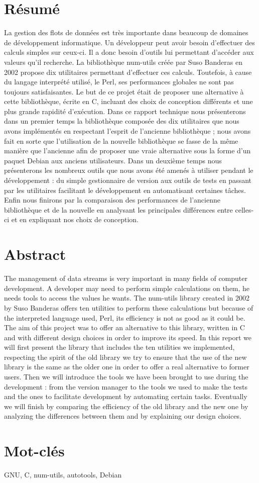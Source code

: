 \section*{R\'esum\'e}

La gestion des flots de donn\'ees est tr\`es importante dans beaucoup de domaines de d\'eveloppement informatique. Un d\'eveloppeur peut avoir besoin 
d'effectuer des calculs simples sur ceux-ci. Il a donc besoin d'outils lui permettant d'acc\'eder aux valeurs qu'il recherche. La biblioth\`eque num-utils
 cr\'e\'ee par Suso Banderas en 2002 propose dix utilitaires permettant d'effectuer ces calculs. Toutefois, \`a cause du langage interpr\'et\'e utilis\'e, 
le Perl, ses performances globales ne sont pas toujours satisfaisantes. Le but de ce projet \'etait de proposer une alternative \`a cette biblioth\`eque, 
\'ecrite en C, incluant des choix de conception diff\'erents et une plus grande rapidit\'e d'ex\'ecution. Dans ce rapport technique nous pr\'esenterons dans un premier temps 
la biblioth\`eque compos\'ee des dix utilitaires que nous avons impl\'ement\'es en respectant l'esprit de l'ancienne biblioth\`eque ; nous avons fait en sorte que
 l'utilisation de la nouvelle biblioth\`eque se fasse de la m\^eme mani\`ere que l'ancienne afin de proposer une vraie alternative sous la forme d'un paquet
 Debian aux anciens utilisateurs. Dans un deuxi\`eme temps nous pr\'esenterons les nombreux outils que nous avons \'et\'e amen\'es \`a utiliser pendant le 
d\'eveloppement : du simple gestionnaire de version aux outils de tests en passant par les utilitaires facilitant le d\'eveloppement en automatisant certaines t\^aches.
 Enfin nous finirons par la comparaison des performances de l'ancienne biblioth\`eque et de la nouvelle en analysant les principales diff\'erences entre celles-ci et en expliquant nos choix de conception.

\section*{Abstract}

The management of data streams is very important in many fields of computer development. A developer may need to perform simple calculations on them, he needs tools
 to access the values he wants. The num-utils library created in 2002 by Suso Banderas offers ten utilities to perform these calculations but because of the
 interpreted language used, Perl, its efficiency is not as good as it could be. The aim of this project was to offer an alternative to this library, written in
 C and with different design choices in order to improve its speed. In this report we will first present the library that includes the ten utilities we implemented,
 respecting the spirit of the old library we try to ensure that the use of the new library is the same as the older one in order to offer a real alternative to former
 users. Then we will introduce the tools we have been brought to use during the development : from the version manager to the tools we used to make the tests and the
 ones to facilitate development by automating certain tasks. Eventually we will finish by comparing the efficiency of the old library and the new one by analyzing the
 differences between them and by explaining our design choices.

\section*{Mot-cl\'es}

GNU, C, num-utils, autotools, Debian
